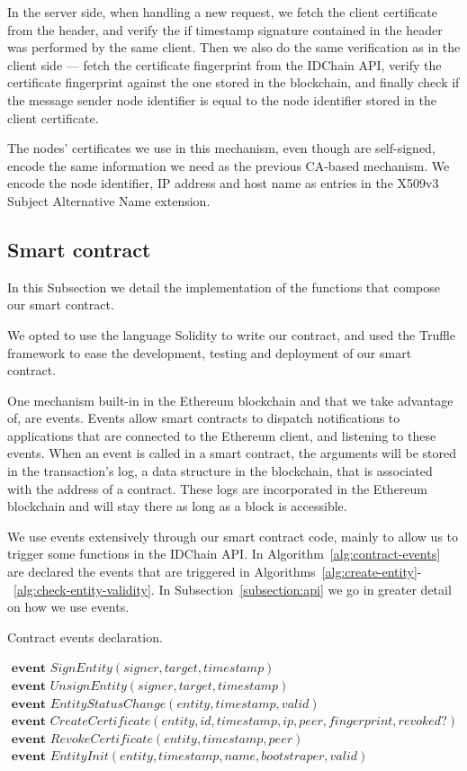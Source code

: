 In the server side, when handling a new request, we fetch the client certificate from the header, and verify the if timestamp signature contained in the header was performed by the same client.
Then we also do the same verification as in the client side — fetch the certificate fingerprint from the IDChain API, verify the certificate fingerprint against the one stored in the blockchain, and finally check if the message sender node identifier is equal to the node identifier stored in the client certificate.

The nodes' certificates we use in this mechanism, even though are self-signed, encode the same information we need as the previous CA-based mechanism.
We encode the node identifier, IP address and host name as entries in the X509v3 Subject Alternative Name extension.

\subsection{Smart contract}\label{subsection:smart-contract}

In this Subsection we detail the implementation of the functions that compose our smart contract.

We opted to use the language Solidity to write our contract, and used the Truffle framework to ease the development, testing and deployment of our smart contract.

One mechanism built-in in the Ethereum blockchain and that we take advantage of, are events.
Events allow smart contracts to dispatch notifications to applications that are connected to the Ethereum client, and listening to these events.
When an event is called in a smart contract, the arguments will be stored in the transaction's log, a data structure in the blockchain, that is associated with the address of a contract.
These logs are incorporated in the Ethereum blockchain and will stay there as long as a block is accessible.

We use events extensively through our smart contract code, mainly to allow us to trigger some functions in the IDChain API.
In Algorithm~\ref{alg:contract-events} are declared the events that are triggered in Algorithms~\ref{alg:create-entity}-~\ref{alg:check-entity-validity}.
In Subsection~\ref{subsection:api} we go in greater detail on how we use events.

\begin{algorithm}[h!]
  \caption{Contract events declaration.}
  \label{alg:contract-events}
  \begin{algorithmic}
    \State $\textbf{ event } SignEntity(signer, target, timestamp)$
    \State $\textbf{ event } UnsignEntity(signer, target, timestamp)$
    \State $\textbf{ event } EntityStatusChange(entity, timestamp, valid)$
    \State $\textbf{ event } CreateCertificate(entity, id, timestamp, ip, peer, fingerprint, revoked?)$
    \State $\textbf{ event } RevokeCertificate(entity, timestamp, peer)$
    \State $\textbf{ event } EntityInit(entity, timestamp, name, bootstraper, valid)$
  \end{algorithmic}
\end{algorithm}

